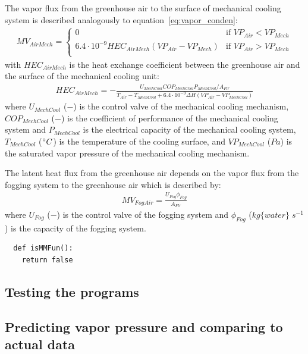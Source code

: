 \documentclass[a4paper]{article}
\begin{document}
The vapor flux from the greenhouse air to the surface of mechanical cooling system is described analogously to equation~\eqref{eq:vapor_conden}:
\begin{align}
  MV_{AirMech} = \begin{cases}
    0                                                     & \text{if~} VP_{Air} < VP_{Mech} \\
    6.4 \cdot 10^{-9} HEC_{AirMech}(VP_{Air} - VP_{Mech}) & \text{if~} VP_{Air} > VP_{Mech} \\
  \end{cases}
\end{align}
with \(HEC_{AirMech}\) is the heat exchange coefficient between the greenhouse air and the surface of the mechanical cooling unit:
\begin{align}
  HEC_{AirMech} = - \frac{U_{MechCool} COP_{MechCool} P_{MechCool} / A_{Flr}}{T_{Air} - T_{MechCool} + 6.4 \cdot 10^{-9} \Delta H(VP_{Air} - VP_{MechCool})}
\end{align}
where \(U_{MechCool}\) (\(-\)) is the control valve of the mechanical cooling mechanism, \(COP_{MechCool}\) (\(-\)) is the coefficient of performance of the mechanical cooling system and \(P_{MechCool}\) is the electrical capacity of the mechanical cooling system, \(T_{MechCool}\) (\(\degree C\)) is the temperature of the cooling surface, and \(VP_{MechCool}\) (\(Pa\)) is the saturated vapor pressure of the mechanical cooling mechanism.

The latent heat flux from the greenhouse air depends on the vapor flux from the fogging system to the greenhouse air which is described by:
\begin{align}
  MV_{FogAir} = \frac{U_{Fog} \phi_{Fog}}{A_{Flr}}
\end{align}
where \(U_{Fog}\) (\(-\)) is the control valve of the fogging system and \(\phi_{Fog}\) (\(kg\{water\}\;s^{-1}\)) is the capacity of the fogging system.

\begin{verbatim}
  def isMMFun():
    return false
\end{verbatim}

\subsection{Testing the programs}

\subsection{Predicting vapor pressure and comparing to actual data}
\end{document}
